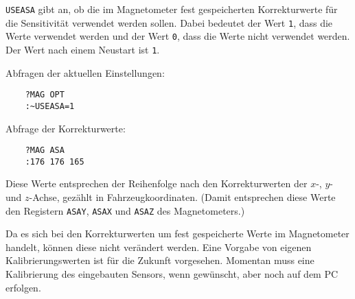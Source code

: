 \verb|USEASA| gibt an, ob die im Magnetometer fest gespeicherten Korrekturwerte für die Sensitivität verwendet werden sollen. Dabei bedeutet der Wert \verb|1|, dass die Werte verwendet werden und der Wert \verb|0|, dass die Werte nicht verwendet werden. Der Wert nach einem Neustart ist \verb|1|.

Abfragen der aktuellen Einstellungen:
\begin{verbatim}
	?MAG OPT
	:~USEASA=1
\end{verbatim}

Abfrage der Korrekturwerte:
\begin{verbatim}
	?MAG ASA
	:176 176 165
\end{verbatim}
Diese Werte entsprechen der Reihenfolge nach den Korrekturwerten der $x$-, $y$- und $z$-Achse, gezählt in Fahrzeugkoordinaten. (Damit entsprechen diese Werte den Registern \verb|ASAY|, \verb|ASAX| und \verb|ASAZ| des Magnetometers.)

Da es sich bei den Korrekturwerten um fest gespeicherte Werte im Magnetometer handelt, können diese nicht verändert werden. {\color[rgb]{0.75,0.75,0.75} Eine Vorgabe von eigenen Kalibrierungswerten ist für die Zukunft vorgesehen. Momentan muss eine Kalibrierung des eingebauten Sensors, wenn gewünscht, aber noch auf dem PC erfolgen.}


